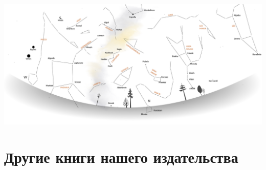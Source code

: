 \documentclass[a5paper,11pt]{memoir}
\newif\ifincludetranslations
\begin{document}
\hspace{-1.70cm}
\includegraphics[width=\paperwidth]{images/stars-annotated.pdf} 

\clearpage


\ifincludetranslations
	\clearpage
	
\fi


\cleartoverso
\thispagestyle{empty}  %


\section*{Другие книги нашего издательства}
\end{document}
